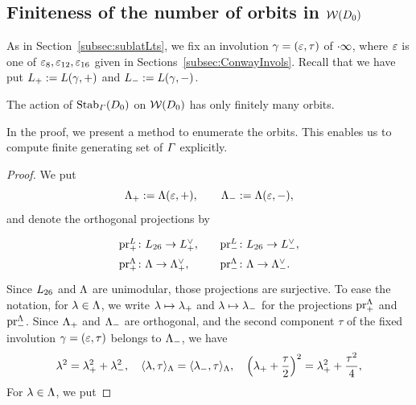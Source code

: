 \documentclass{amsart} %
\begin{document}
\subsection{Finiteness of the number of orbits in $\mathord{\mathcal{W}}(D_0)$}\label{subsec:finite}
%
As in Section~\ref{subsec:sublatLts}, 
we fix an involution $\gamma=(\varepsilon, \tau)$ of $\cdot \infty$,
where $\varepsilon$ is one of $\varepsilon_8, \varepsilon_{12}, \varepsilon_{16}$ 
given in Sections~\ref{subsec:ConwayInvols}.
Recall that we have put $L_{+}:=L(\gamma, +)$
and $L_{-}:=L(\gamma, -)$.
%
\begin{theorem}
The action of $\operatorname{Stab}_{\varGamma}(D_0)$ on $\mathord{\mathcal{W}}(D_0)$ has only finitely many orbits.
\end{theorem}
%
In the proof,
we present a method to enumerate the orbits.
This enables us to compute finite generating set of $\varGamma$
explicitly.
%
\begin{proof}
We put
\[
\Lambda_{+}:=\Lambda(\varepsilon, +),
\qquad
\Lambda_{-}:=\Lambda(\varepsilon,-), 
\]
and denote the orthogonal projections by
%
\[
\renewcommand{\arraystretch}{1.5}
\begin{array}{lll}
\prLplus \colon\Lts\to \Lplus\dual, &&
\prLminus\colon \Lts\to \Lminus\dual,\\
\prLeechplus\colon \Leech\to \Leechplus\dual, &&
\prLeechminus\colon\Leech\to \Leechminus\dual.
\end{array}
\]
%
Since $L_{26}$ and $\Lambda$ are unimodular, 
those projections are surjective.
%
%
%
%
To ease the notation, for $\lambda\in \Lambda$, 
we write $\lambda\mapsto {\lambda}_{+}$ and $\lambda\mapsto {\lambda}_{-}$ 
for the projections $\operatorname{pr}^{\Lambda}_{+}$ and $\operatorname{pr}^{\Lambda}_{-}$.
Since $\Lambda_{+}$ and $ \Lambda_{-}$ are orthogonal, and 
the second component $\tau$ of 
the fixed involution $\gamma=(\varepsilon, \tau)$ belongs to $ \Lambda_{-}$, 
we have 
\[
\lambda^2={\lambda}_{+}^2+{\lambda}_{-}^2,
\quad
\langle \lambda, \tau \rangle_{\Lambda}=\langle {\lambda}_{-}, \tau \rangle_{\Lambda}, 
\quad
\left({\lambda}_{+} +\frac{\tau}{2} \right)^2={\lambda}_{+}^2+\frac{\tau^2}{4}, 
\]
For $\lambda\in \Lambda$, we put

\end{proof}
\end{document}

